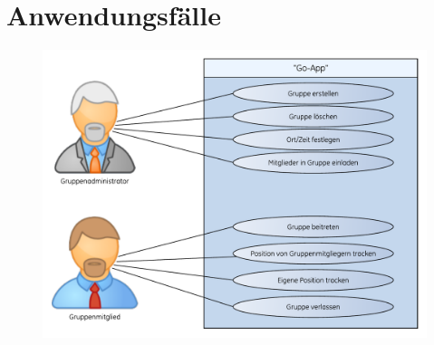 \section{Anwendungsfälle}
\begin{figure} [H]
	\centering
	\includegraphics[scale=0.8, trim=2cm 0 0 0cm]{res/anwendungsfall.pdf}
\end{figure}

